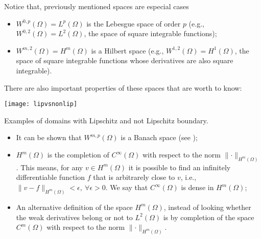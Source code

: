 Notice that, previously mentioned spaces are especial cases
\begin{itemize}
\item $W^{0,p}(\Omega) = L^p(\Omega)$ is the Lebesgue space of order $p$ (e.g., $W^{0,2}(\Omega) = L^2(\Omega)$,
the space of square integrable functions);\\
\item $W^{m,2}(\Omega) = H^m(\Omega)$ is a Hilbert space (e.g., $W^{1,2}(\Omega) = H^1(\Omega)$, the
space of square integrable functions whose derivatives are also square integrable).
\end{itemize}

There are also important properties of these spaces that are worth to know:

\begin{marginfigure}[-4.0cm]
	\texttt{[image: lipvsnonlip]}
	\caption[]{Examples of domains with Lipschitz and not Lipschitz boundary.}
\end{marginfigure}

\begin{itemize}
\item It can be shown that $W^{m,p}(\Omega)$ is a Banach space (see \cite{Brenner});\\
\item $H^m(\Omega)$ is the completion of $C^{\infty}(\Omega)$ with respect to
the norm $\lVert \cdot \rVert_{H^m(\Omega)}$. This means, for any $v \in H^m(\Omega)$
it is possible to find an infinitely differentiable function $f$ that is arbitrarely
close to $v$, i.e., $\lVert v - f \rVert_{H^m(\Omega)} < \epsilon,~\forall \epsilon > 0$.
We say that $C^{\infty}(\Omega)$ is dense in $H^m(\Omega)$;\\

\item An alternative definition of the space $H^m(\Omega)$, instead
of looking whether the weak derivatives belong or not to $L^2(\Omega)$ 
is by completion of the space $C^m(\Omega)$ with respect to the norm
$\lVert \cdot \rVert_{H^m(\Omega)}$. 
\end{itemize}

